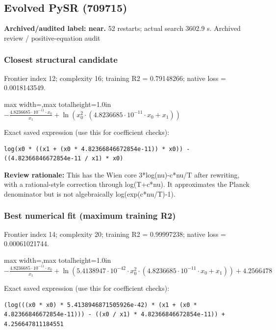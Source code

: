 \documentclass[10pt,letterpaper,landscape]{article}
\begin{document}
\begin{minipage}[t]{0.485\textwidth}
\subsection*{Evolved PySR (709715)}
\textbf{Archived/audited label: near.} 52 restarts; actual search 3602.9 s.
{\small Archived review / positive-equation audit}
\subsubsection*{Closest structural candidate}
Frontier index 12; complexity 16; training R2 = 0.79148266; native loss = 0.0018143549.
\begin{center}\begin{adjustbox}{max width=\linewidth,max totalheight=1.0in}$\displaystyle - \frac{4.8236685 \cdot 10^{-11} \cdot x_{0}}{x_{1}} + \ln{\left(x_{0}^{2} \cdot \left(4.8236685 \cdot 10^{-11} \cdot x_{0} + x_{1}\right) \right)}$\end{adjustbox}\end{center}
{\scriptsize Exact saved expression (use this for coefficient checks):}
\begin{lstlisting}
log(x0 * ((x1 + (x0 * 4.82366846672854e-11)) * x0)) - ((4.82366846672854e-11 / x1) * x0)
\end{lstlisting}
{\small\textbf{Review rationale:} This has the Wien core 3*log(nu)-c*nu/T after rewriting, with a rational-style correction through log(T+c*nu). It approximates the Planck denominator but is not algebraically log(exp(c*nu/T)-1).}
\subsubsection*{Best numerical fit (maximum training R2)}
Frontier index 14; complexity 20; training R2 = 0.99997238; native loss = 0.00061021744.
\begin{center}\begin{adjustbox}{max width=\linewidth,max totalheight=1.0in}$\displaystyle - \frac{4.8236685 \cdot 10^{-11} \cdot x_{0}}{x_{1}} + \ln{\left(5.4138947 \cdot 10^{-42} \cdot x_{0}^{2} \cdot \left(4.8236685 \cdot 10^{-11} \cdot x_{0} + x_{1}\right) \right)} + 4.2566478$\end{adjustbox}\end{center}
{\scriptsize Exact saved expression (use this for coefficient checks):}
\begin{lstlisting}
(log(((x0 * x0) * 5.4138946871505926e-42) * (x1 + (x0 * 4.82366846672854e-11))) - ((x0 / x1) * 4.82366846672854e-11)) + 4.256647811184551
\end{lstlisting}
\end{minipage}
\clearpage{}\label{planck-10001}
\end{document}
